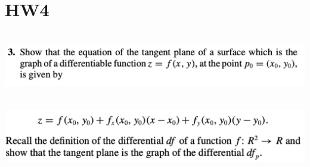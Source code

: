 \documentclass{report}
\begin{document}
\section{HW4}
\begin{question}{}{}
\includegraphics[height=3cm,width=18cm]{hw4q1}
\includegraphics[height=3cm,width=18cm]{hw4q1a}
\end{question}
\end{document}
